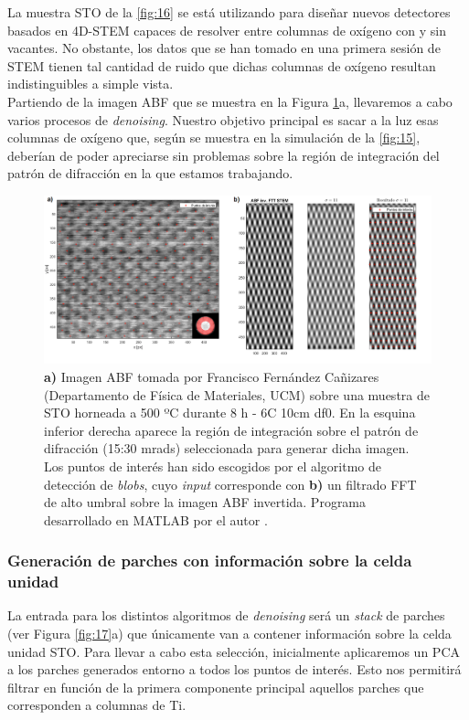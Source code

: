 La muestra STO de la \autoref{fig:16} se está utilizando para diseñar nuevos detectores basados en 4D-STEM capaces de resolver entre columnas de oxígeno con y sin vacantes. No obstante, los datos que se han tomado en una primera sesión de STEM tienen tal cantidad de ruido que dichas columnas de oxígeno resultan indistinguibles a simple vista.\\

Partiendo de la imagen ABF que se muestra en la Figura \ref{fig:16}a, llevaremos a cabo varios procesos de \textit{denoising}. Nuestro objetivo principal es sacar a la luz esas columnas de oxígeno que, según se muestra en la simulación de la \autoref{fig:15}, deberían de poder apreciarse sin problemas sobre la región de integración del patrón de difracción en la que estamos trabajando.

\begin{figure}[h!]
    \centering
    \includegraphics[width=1\textwidth]{fig/Fig16.png}
    \caption{\textbf{a)} Imagen ABF tomada por Francisco Fernández Cañizares (Departamento de Física de Materiales, UCM) sobre una muestra de STO horneada a 500 ºC durante 8 h - 6C 10cm df0. En la esquina inferior derecha aparece la región de integración sobre el patrón de difracción (15:30 mrads) seleccionada para generar dicha imagen. Los puntos de interés han sido escogidos por el algoritmo de detección de \textit{blobs}, cuyo \textit{input} corresponde con \textbf{b)} un filtrado FFT de alto umbral sobre la imagen ABF invertida. Programa desarrollado en MATLAB por el autor \cite{repo}.}
    \label{fig:16}
\end{figure}

\subsubsection{Generación de parches con información sobre la celda unidad}

La entrada para los distintos algoritmos de \textit{denoising} será un \textit{stack} de parches (ver Figura \ref{fig:17}a) que únicamente van a contener información sobre la celda unidad STO. Para llevar a cabo esta selección, inicialmente aplicaremos un PCA a los parches generados entorno a todos los puntos de interés. Esto nos permitirá filtrar en función de la primera componente principal aquellos parches que corresponden a columnas de Ti.\\


